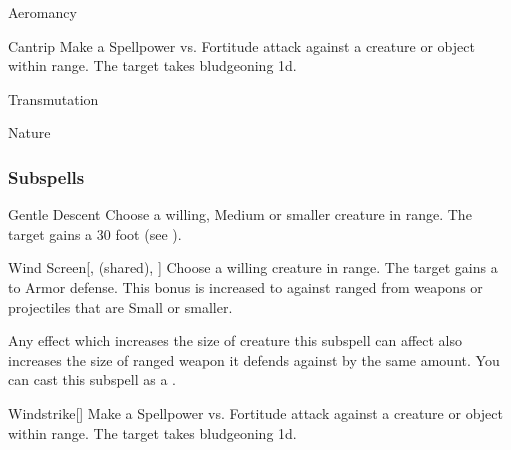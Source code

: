 
\begin{spellsection}{Aeromancy}

\begin{spellheader}
\end{spellheader}


\begin{ability}{Cantrip}
Make a Spellpower vs. Fortitude attack against a creature or object within \rngmed range.
\hit The target takes bludgeoning  \minus1d.
\end{ability}




 Transmutation

 Nature
\end{spellsection}


\subsubsection{Subspells}


\begin{ability}[\nth{1}]{Gentle Descent}
Choose a willing, Medium or smaller creature in \rngclose range.
The target gains a 30 foot  (see ).
\end{ability}
\vspace{0.25em}


\begin{ability}[\nth{1}]{Wind Screen}[,  (shared), ]
Choose a willing creature in \rngclose range.
The target gains a   to Armor defense.
This bonus is increased to  against ranged  from weapons or projectiles that are Small or smaller.

Any effect which increases the size of creature this subspell can affect also increases the size of ranged weapon it defends against by the same amount.
You can cast this subspell as a .
\end{ability}
\vspace{0.25em}


\begin{ability}[\nth{1}]{Windstrike}[]
Make a Spellpower vs. Fortitude attack against a creature or object within \rngmed range.
\hit The target takes bludgeoning  \plus1d.
\end{ability}
\vspace{0.25em}


